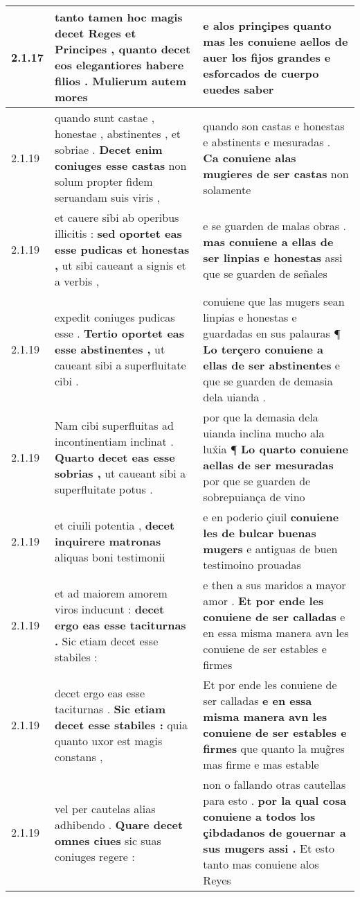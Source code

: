 \begin{tabular}{|p{1cm}|p{6.5cm}|p{6.5cm}|}
2.1.17 & tanto tamen hoc magis decet Reges et Principes , \textbf{ quanto decet eos elegantiores habere filios . } Mulierum autem mores & e alos prinçipes \textbf{ quanto mas les conuiene aellos de auer los fijos grandes e esforcados de cuerpo } euedes saber \\\hline
2.1.19 & quando sunt castae , honestae , abstinentes , et sobriae . \textbf{ Decet enim coniuges esse castas } non solum propter fidem seruandam suis viris , & quando son castas e honestas e abstinents e mesuradas . \textbf{ Ca conuiene alas mugieres de ser castas } non solamente \\\hline
2.1.19 & et cauere sibi ab operibus illicitis : \textbf{ sed oportet eas esse pudicas et honestas , } ut sibi caueant a signis et a verbis , & e se guarden de malas obras . \textbf{ mas conuiene a ellas de ser linpias e honestas } assi que se guarden de señales \\\hline
2.1.19 & expedit coniuges pudicas esse . \textbf{ Tertio oportet eas esse abstinentes , } ut caueant sibi a superfluitate cibi . & conuiene que las mugers sean linpias e honestas e guardadas en sus palauras ¶ \textbf{ Lo terçero conuiene a ellas de ser abstinentes } e que se guarden de demasia dela uianda . \\\hline
2.1.19 & Nam cibi superfluitas ad incontinentiam inclinat . \textbf{ Quarto decet eas esse sobrias , } ut caueant sibi a superfluitate potus . & por que la demasia dela uianda inclina mucho ala lux̉ia ¶ \textbf{ Lo quarto conuiene aellas de ser mesuradas } por que se guarden de sobrepuiança de vino \\\hline
2.1.19 & et ciuili potentia , \textbf{ decet inquirere matronas } aliquas boni testimonii & e en poderio çiuil \textbf{ conuiene les de bulcar buenas mugers } e antiguas de buen testimoino prouadas \\\hline
2.1.19 & et ad maiorem amorem viros inducunt : \textbf{ decet ergo eas esse taciturnas . } Sic etiam decet esse stabiles : & e then a sus maridos a mayor amor . \textbf{ Et por ende les conuiene de ser calladas } e en essa misma manera avn les conuiene de ser estables e firmes \\\hline
2.1.19 & decet ergo eas esse taciturnas . \textbf{ Sic etiam decet esse stabiles : } quia quanto uxor est magis constans , & Et por ende les conuiene de ser calladas \textbf{ e en essa misma manera avn les conuiene de ser estables e firmes } que quanto la mug̃res mas firme e mas estable \\\hline
2.1.19 & vel per cautelas alias adhibendo . \textbf{ Quare decet omnes ciues } sic suas coniuges regere : & non o fallando otras cautellas para esto . \textbf{ por la qual cosa conuiene a todos los çibdadanos de gouernar a sus mugers assi . } Et esto tanto mas conuiene alos Reyes \\\hline

\end{tabular}
